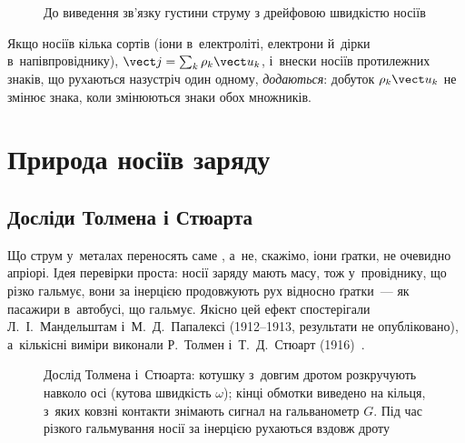 \begin{figure}\centering
	\caption{До виведення зв'язку густини струму з дрейфовою швидкістю носіїв\label{pic:ElectronCylinder}}
\end{figure}

\begin{Attention}
	Якщо носіїв кілька сортів (іони в~електроліті, електрони й~дірки в~напівпровіднику),
	$\vect j = \sum_k \rho_k\vect u_k$, і~внески носіїв протилежних знаків, що рухаються
	назустріч один одному, \emph{додаються}: добуток $\rho_k\vect u_k$ не змінює знака, коли
	змінюються знаки обох множників.
\end{Attention}

\section{Природа носіїв заряду}\label{sec:CarriersNature}\hypertarget{charge-carriers-nature}{}

\subsection*{Досліди Толмена і Стюарта}

Що струм у~металах переносять саме , а~не,
скажімо, іони ґратки, не очевидно апріорі. Ідея перевірки проста: носії заряду мають масу,
тож у~провіднику, що різко гальмує, вони за інерцією продовжують рух відносно ґратки~---
як пасажири в~автобусі, що гальмує. Якісно цей ефект спостерігали Л.~І.~Мандельштам
і~М.~Д.~Папалексі (1912--1913, результати не опубліковано), а~кількісні виміри виконали Р.~Толмен і~Т.~Д.~Стюарт (1916)~\cite{Tolman1916}.

\begin{figure}\centering
	\caption{Дослід Толмена і~Стюарта: котушку з~довгим дротом розкручують навколо осі
		(кутова швидкість $\omega$); кінці обмотки виведено на кільця, з~яких ковзні контакти
		знімають сигнал на гальванометр $G$. Під час різкого гальмування носії за інерцією
		рухаються вздовж дроту\label{pic:TolmanStewart}}
\end{figure}

